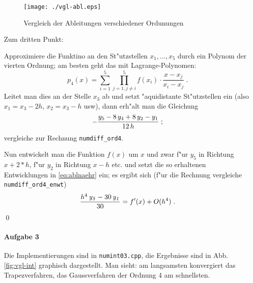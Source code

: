\documentclass[a4paper,12pt]{article}
\newcommand{\abs}[0]{\bigskip\noindent}
\begin{document}
\begin{figure}[h]
	\begin{center}
		\texttt{[image: ./vgl-abl.eps]}
	\end{center}
	\caption{Vergleich der Ableitungen verschiedener Ordunungen}
	\label{fig:vgl-abl}
\end{figure}


\abs
Zum dritten Punkt:

Approximiere die Funktino an den St"utzstellen $x_1, \dots, x_5$ durch ein Polynom der vierten Ordnung; am besten geht das mit Lagrange-Polynomen:
\begin{equation}
	p_4(x) = \sum_{i=1}^{5} \prod_{j = 1, j \neq i}^5 f(x_i) \cdot \frac{x-x_j}{x_i-x_j} \;.
	\label{eq:p4}
\end{equation}
Leitet man dies an der Stelle $x_3$ ab und setzt "aquidistante St"utzstellen ein (also $x_1 = x_3 - 2h$, $x_2 = x_3-h$ usw), dann erh"alt man die Gleichung
\begin{equation}
	-{{ y_{5}-8\,y_{4}+8\,y_{2}-y_{1}}\over{12\,h}} \;;
	\label{eq:ablnaehr}
\end{equation}
vergleiche zur Rechnung \texttt{numdiff\_ord4}.

Nun entwickelt man die Funktion $f(x)$ um $x$ und zwar f"ur $y_5$ in Richtung $x + 2*h$, f"ur $y_2$ in Richtung $x - h$ etc. und setzt die so erhaltenen Entwicklungen in \ref{eq:ablnaehr} ein; es ergibt sich (f"ur die Rechnung vergleiche \texttt{numdiff\_ord4\_enwt})
\begin{equation}
	{ {h^4\,{\it y_5}-30\,{\it y_1}}\over{30}} = f'(x) + O(h^4) \;.
	\label{eq:ordn}
\end{equation}
\qed


\paragraph{Aufgabe 3}

Die Implementierungen sind in \texttt{numint03.cpp}, die Ergebnisse sind in
Abb. \ref{fig:vgl-int}
graphisch dargestellt. Man sieht: am langsamsten konvergiert das
Trapezverfahren, das Gaussverfahren der Ordnung 4 am schnellsten.
\end{document}
